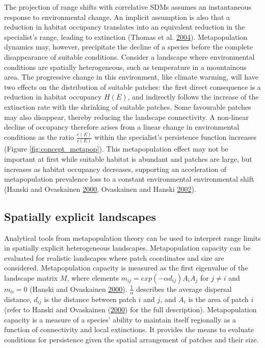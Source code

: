 \documentclass[12pt]{article}
\begin{document}
The projection of range shifts with correlative SDMs assumes an
instantaneous response to environmental change. An implicit assumption
is also that a reduction in habitat occupancy translates into an
equivalent reduction in the specialist's range, leading to extinction
(Thomas et al. \protect\hyperlink{ref-thomas_extinction_2004}{2004}).
Metapopulation dynamics may, however, precipitate the decline of a
species before the complete disappearance of suitable conditions.
Consider a landscape where environmental conditions are spatially
heterogeneous, such as temperature in a mountainous area. The
progressive change in this environment, like climate warming, will have
two effects on the distribution of suitable patches: the first direct
consequence is a reduction in habitat occupancy \(H(E)\), and indirectly
follows the increase of the extinction rate with the shrinking of
suitable patches. Some favourable patches may also disappear, thereby
reducing the landscape connectivity. A non-linear decline of occupancy
therefore arises from a linear change in environmental conditions as the
ratio \(\frac{e(E)}{c(E)}\) within the specialist's persistence function
increases (Figure \ref{fig:concept_metapop}). This metapopulation effect
may not be important at first while suitable habitat is abundant and
patches are large, but increases as habitat occupancy decreases,
supporting an acceleration of metapopulation prevalence loss to a
constant environmental environmental shift (Hanski and Ovaskainen
\protect\hyperlink{ref-hanski_metapopulation_2000}{2000}, Ovaskainen and
Hanski \protect\hyperlink{ref-ovaskainen_transient_2002}{2002}).

\hypertarget{spatially-explicit-landscapes}{%
\subsection{Spatially explicit
landscapes}\label{spatially-explicit-landscapes}}

Analytical tools from metapopulation theory can be used to interpret
range limits in spatially explicit heterogeneous landscapes.
Metapopulation capacity can be evaluated for realistic landscapes where
patch coordinates and size are considered. Metapopulation capacity is
measured as the first eigenvalue of the landscape matrix \(M\), where
elements \(m_{ij} = exp(-\alpha d_{ij})A_{i}A_{j}\) for \(j \neq i\) and
\(m_{ii} = 0\) (Hanski and Ovaskainen
\protect\hyperlink{ref-hanski_metapopulation_2000}{2000}).
\(\frac{1}{\alpha}\) describes the average dispersal distance,
\(d_{ij}\) is the distance between patch \(i\) and \(j\), and \(A_{i}\)
is the area of patch \(i\) (refer to Hanski and Ovaskainen
(\protect\hyperlink{ref-hanski_metapopulation_2000}{2000}) for the full
description). Metapopulation capacity is a measure of a species' ability
to maintain itself regionally as a function of connectivity and local
extinctions. It provides the means to evaluate conditions for
persistence given the spatial arrangement of patches and their size.
\end{document}
